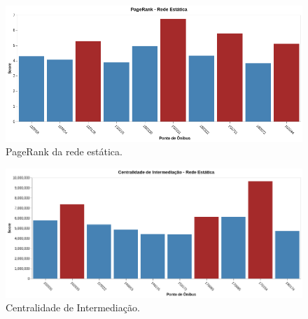 \begin{figure}
\centering
\includegraphics[width=.9\textwidth]{Capitulo4/img/pagerank.png}
\caption{PageRank da rede estática.}
\label{fig:eventos-de-proximidade}
\end{figure}


\begin{figure}
\centering
\includegraphics[width=.9\textwidth]{Capitulo4/img/centralidade-intermediacao.png}
\caption{Centralidade de Intermediação.}
\label{fig:eventos-de-proximidade}
\end{figure}





